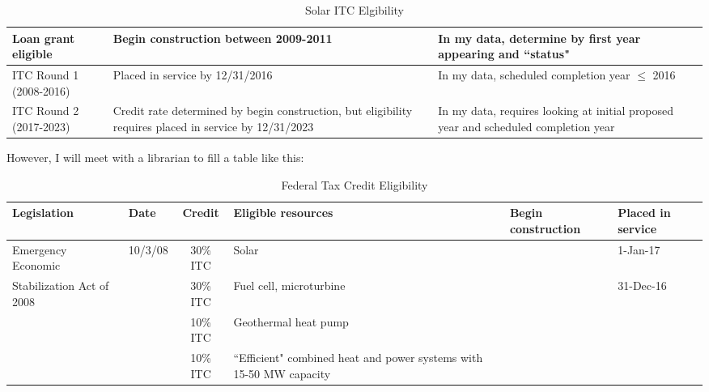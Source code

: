 \documentclass[12pt, oneside]{article}   	%
\begin{document}
\begin{table}[h!]
\caption{Solar ITC Elgibility}
\vspace{10pt}
\begin{tabular}{lp{5cm}p{7cm}}
\toprule
Loan grant eligible & Begin construction between 2009-2011 & In my data, determine by first year appearing and ``status"\\
\midrule
ITC Round 1 (2008-2016) & Placed in service by 12/31/2016 & In my data, scheduled completion year $\leq$ 2016 \\
\midrule
ITC Round 2 (2017-2023) & Credit rate determined by begin construction, but eligibility requires placed in service by 12/31/2023 & In my data, requires looking at initial proposed year and scheduled completion year \\
\bottomrule
\end{tabular} 
\end{table}

However, I will meet with a librarian to fill a table like this: 


\begin{table}[h]
\caption{Federal Tax Credit Eligibility}
\begin{tabular}{p{4cm}p{1.5cm}cp{4cm}p{3.5cm}l}
\toprule
Legislation                                  & Date & Credit   & Eligible resources                                                  & Begin construction & Placed in service \\
\midrule
Emergency Economic  & 10/3/08          & 30\% ITC & Solar                                                               &                                & 1-Jan-17                      \\Stabilization Act of 2008
                                             &                  & 30\% ITC & Fuel cell, microturbine                                             &                                & 31-Dec-16                     \\
                                             &                  & 10\% ITC & Geothermal heat pump                                                &                                &                               \\
                                             &                  & 10\% ITC & ``Efficient" combined heat and power systems with 15-50 MW capacity &                                &                  \\
                                             \bottomrule            
\end{tabular}
\end{table}
\end{document}
